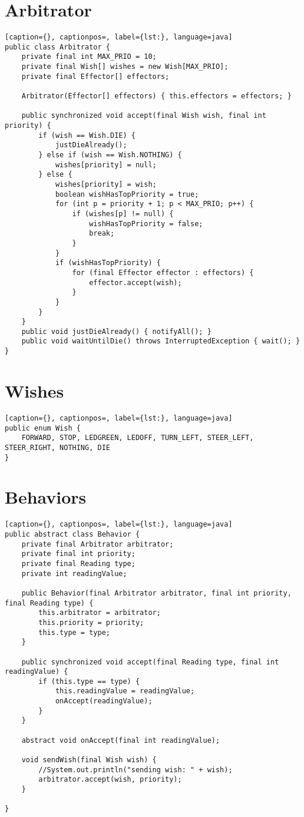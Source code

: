 \section{Arbitrator}
\begin{lstlisting}[caption={}, captionpos=, label={lst:}, language=java]
public class Arbitrator {
    private final int MAX_PRIO = 10;
    private final Wish[] wishes = new Wish[MAX_PRIO];
    private final Effector[] effectors;

    Arbitrator(Effector[] effectors) { this.effectors = effectors; }

    public synchronized void accept(final Wish wish, final int priority) {
        if (wish == Wish.DIE) { 
			justDieAlready(); 
		} else if (wish == Wish.NOTHING) {
			wishes[priority] = null;
		} else {
            wishes[priority] = wish;
            boolean wishHasTopPriority = true;
            for (int p = priority + 1; p < MAX_PRIO; p++) {
                if (wishes[p] != null) {
                    wishHasTopPriority = false;
                    break;
                }
            }
            if (wishHasTopPriority) {
                for (final Effector effector : effectors) {
                    effector.accept(wish);
                }
            }
        }
    }
    public void justDieAlready() { notifyAll(); }
    public void waitUntilDie() throws InterruptedException { wait(); }
}
\end{lstlisting}

\section{Wishes}
\begin{lstlisting}[caption={}, captionpos=, label={lst:}, language=java]
public enum Wish {
	FORWARD, STOP, LEDGREEN, LEDOFF, TURN_LEFT, STEER_LEFT, STEER_RIGHT, NOTHING, DIE
}
\end{lstlisting}

\section{Behaviors}
\begin{lstlisting}[caption={}, captionpos=, label={lst:}, language=java]
public abstract class Behavior {
	private final Arbitrator arbitrator;
	private final int priority;
	private final Reading type;
	private int readingValue;

	public Behavior(final Arbitrator arbitrator, final int priority, final Reading type) {
		this.arbitrator = arbitrator;
		this.priority = priority;
		this.type = type;
	}

	public synchronized void accept(final Reading type, final int readingValue) {
		if (this.type == type) {
			this.readingValue = readingValue;
			onAccept(readingValue);
		}
	}

	abstract void onAccept(final int readingValue);

	void sendWish(final Wish wish) {
		//System.out.println("sending wish: " + wish);
		arbitrator.accept(wish, priority);
	}

}
\end{lstlisting}

